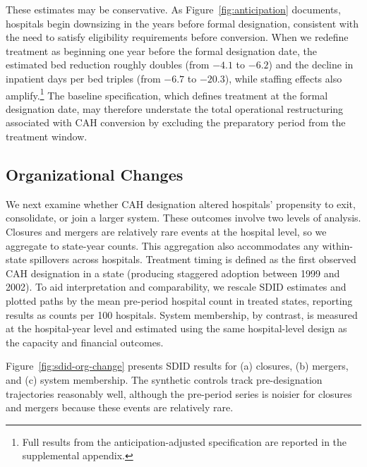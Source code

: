 \documentclass[a4paper, 12pt, twoside]{article}
\begin{document}
These estimates may be conservative. As Figure~\ref{fig:anticipation} documents, hospitals begin downsizing in the years before formal designation, consistent with the need to satisfy eligibility requirements before conversion. When we redefine treatment as beginning one year before the formal designation date, the estimated bed reduction roughly doubles (from $-4.1$ to $-6.2$) and the decline in inpatient days per bed triples (from $-6.7$ to $-20.3$), while staffing effects also amplify.\footnote{Full results from the anticipation-adjusted specification are reported in the supplemental appendix.} The baseline specification, which defines treatment at the formal designation date, may therefore understate the total operational restructuring associated with CAH conversion by excluding the preparatory period from the treatment window.

\subsection{Organizational Changes}
\label{sec:orgchange}

We next examine whether CAH designation altered hospitals’ propensity to exit, consolidate, or join a larger system. These outcomes involve two levels of analysis. Closures and mergers are relatively rare events at the hospital level, so we aggregate to state-year counts. This aggregation also accommodates any within-state spillovers across hospitals. Treatment timing is defined as the first observed CAH designation in a state (producing staggered adoption between 1999 and 2002). To aid interpretation and comparability, we rescale SDID estimates and plotted paths by the mean pre-period hospital count in treated states, reporting results as counts per 100 hospitals. System membership, by contrast, is measured at the hospital-year level and estimated using the same hospital-level design as the capacity and financial outcomes.

Figure~\ref{fig:sdid-org-change} presents SDID results for (a) closures, (b) mergers, and (c) system membership. The synthetic controls track pre-designation trajectories reasonably well, although the pre-period series is noisier for closures and mergers because these events are relatively rare.
\end{document}
